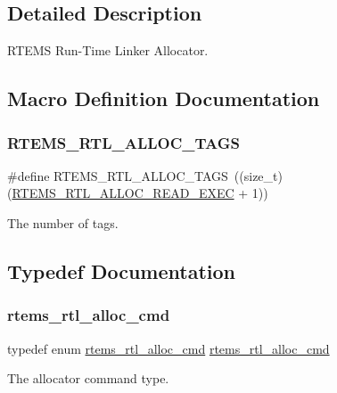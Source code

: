 \subsection{Detailed Description}
R\+T\+E\+MS Run-\/\+Time Linker Allocator. 



\subsection{Macro Definition Documentation}
\mbox{\label{rtl-allocator_8h_a54535608b5611dda0d9f501ac2237b9c}} 
\subsubsection{\texorpdfstring{RTEMS\_RTL\_ALLOC\_TAGS}{RTEMS\_RTL\_ALLOC\_TAGS}}
{\footnotesize\ttfamily \#define R\+T\+E\+M\+S\+\_\+\+R\+T\+L\+\_\+\+A\+L\+L\+O\+C\+\_\+\+T\+A\+GS~((size\+\_\+t) (\mbox{\hyperlink{rtl-allocator_8h_a7c05573cbeda9e9091ba58ceaf0fa2cca6567664261801bd8497d735196daff91}{R\+T\+E\+M\+S\+\_\+\+R\+T\+L\+\_\+\+A\+L\+L\+O\+C\+\_\+\+R\+E\+A\+D\+\_\+\+E\+X\+EC}} + 1))}

The number of tags. 

\subsection{Typedef Documentation}
\mbox{\label{rtl-allocator_8h_afbca5741746edb9e51e1cce92f68f96e}} 
\subsubsection{\texorpdfstring{rtems\_rtl\_alloc\_cmd}{rtems\_rtl\_alloc\_cmd}}
{\footnotesize\ttfamily typedef enum \mbox{\hyperlink{rtl-allocator_8h_aab433aa2d9689f924523cc8196318daf}{rtems\+\_\+rtl\+\_\+alloc\+\_\+cmd}} \mbox{\hyperlink{rtl-allocator_8h_aab433aa2d9689f924523cc8196318daf}{rtems\+\_\+rtl\+\_\+alloc\+\_\+cmd}}}

The allocator command type. \mbox{\label{rtl-allocator_8h_a445a8615118b7fc14005ab20583153fd}} 
